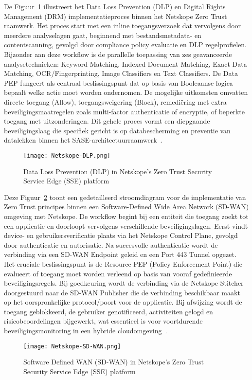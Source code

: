 De Figuur~\ref{fig:Netskope-DLP} illustreert het Data Loss Prevention (DLP) en Digital Rights Management (DRM) implementatieproces binnen het Netskope Zero Trust raamwerk. Het proces start met een inline toegangsverzoek dat vervolgens door meerdere analyselagen gaat, beginnend met bestandsmetadata- en contentscanning, gevolgd door compliance policy evaluatie en DLP regelprofielen. Bijzonder aan deze workflow is de parallelle toepassing van zes geavanceerde analysetechnieken: Keyword Matching, Indexed Document Matching, Exact Data Matching, OCR/Fingerprinting, Image Classifiers en Text Classifiers. De Data PEP fungeert als centraal beslissingspunt dat op basis van Booleaanse logica bepaalt welke actie moet worden ondernomen. De mogelijke uitkomsten omvatten directe toegang (Allow), toegangsweigering (Block), remediëring met extra beveiligingsmaatregelen zoals multi-factor authenticatie of encryptie, of beperkte toegang met uitzonderingen. Dit gehele proces vormt een diepgaande beveiligingslaag die specifiek gericht is op databescherming en preventie van datalekken binnen het SASE-architectuurraamwerk~\autocite{Netskope2024}.
\begin{figure}[h!]
  \centering
  \texttt{[image: Netskope-DLP.png]}
  \caption[]{Data Loss Prevention (DLP) in Netskope's Zero Trust Security Service Edge (SSE) platform~\autocite{Netskope2024}}
  \label{fig:Netskope-DLP}
\end{figure}

Deze Figuur~\ref{fig:Netskope-SD-WAN} toont een gedetailleerd stroomdiagram voor de implementatie van Zero Trust principes binnen een Software-Defined Wide Area Network (SD-WAN) omgeving met Netskope. De workflow begint bij een entiteit die toegang zoekt tot een applicatie en doorloopt vervolgens verschillende beveiligingslagen. Eerst vindt device- en gebruikersverificatie plaats via het Netskope Control Plane, gevolgd door authenticatie en autorisatie. Na succesvolle authenticatie wordt de verbinding via een SD-WAN Endpoint geleid en een Port 443 Tunnel opgezet. Het cruciale beslissingspunt is de Resource PEP (Policy Enforcement Point) die evalueert of toegang moet worden verleend op basis van vooraf gedefinieerde beveiligingsregels. Bij goedkeuring wordt de verbinding via de Netskope Stitcher doorgestuurd naar de SD-WAN Publisher die de verbinding beschikbaar maakt op het oorspronkelijke protocol/poort voor de applicatie. Bij afwijzing wordt de toegang geblokkeerd, de gebruiker genotificeerd, activiteiten gelogd en risicobeoordelingen bijgewerkt, wat essentieel is voor voortdurende beveiligingsmonitoring in een hybride cloudomgeving~\autocite{Netskope2024}.
\begin{figure}[h!]
  \centering
  \texttt{[image: Netskope-SD-WAN.png]}
  \caption[]{Software Defined WAN (SD-WAN) in Netskope's Zero Trust Security Service Edge (SSE) platform~\autocite{Netskope2024}}
  \label{fig:Netskope-SD-WAN}
\end{figure}


